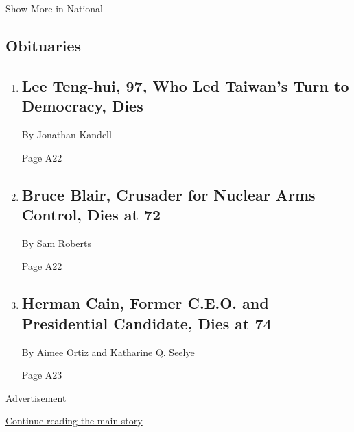 Show More in National

\hypertarget{obituaries}{%
\subsection{Obituaries}\label{obituaries}}

\begin{enumerate}
\def\labelenumi{\arabic{enumi}.}
\item
  \href{/2020/07/30/world/asia/lee-teng-hui-dead.html}{}

  \hypertarget{lee-teng-hui-97-who-led-taiwans-turn-to-democracy-dies}{%
  \subsection{Lee Teng-hui, 97, Who Led Taiwan's Turn to Democracy,
  Dies}\label{lee-teng-hui-97-who-led-taiwans-turn-to-democracy-dies}}

  By Jonathan Kandell

  Page A22
\item
  \href{/2020/07/24/us/bruce-blair-dead.html}{}

  \hypertarget{bruce-blair-crusader-for-nuclear-arms-control-dies-at-72}{%
  \subsection{Bruce Blair, Crusader for Nuclear Arms Control, Dies at
  72}\label{bruce-blair-crusader-for-nuclear-arms-control-dies-at-72}}

  By Sam Roberts

  Page A22
\item
  \href{/2020/07/30/us/politics/herman-cain-dead.html}{}

  \hypertarget{herman-cain-former-ceo-and-presidential-candidate-dies-at-74-1}{%
  \subsection{Herman Cain, Former C.E.O. and Presidential Candidate,
  Dies at
  74}\label{herman-cain-former-ceo-and-presidential-candidate-dies-at-74-1}}

  By Aimee Ortiz and Katharine Q. Seelye

  Page A23
\end{enumerate}

Advertisement

\protect\hyperlink{after-mid3}{Continue reading the main story}

